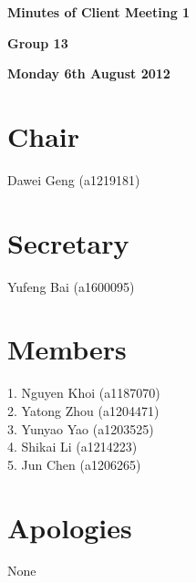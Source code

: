 \documentclass[11pt, a4paper]{article}
\begin{document}
 



\vspace*{15pt}

\begin{center}
\huge \bf Minutes of Client Meeting 1
\end{center}


\begin{center}
\Large \bf Group 13
\end{center}

\begin{center}
\Large \bf Monday 6th August 2012
\end{center}

\section*{Chair}
 Dawei Geng (a1219181)

\section*{Secretary}
Yufeng Bai (a1600095)

\section*{Members}
1. Nguyen Khoi (a1187070)\\
2. Yatong Zhou (a1204471)\\
3. Yunyao Yao (a1203525)\\
4. Shikai Li (a1214223)\\
5. Jun Chen (a1206265)
\vspace*{10pt}

\section*{Apologies}
None

\end{document}
